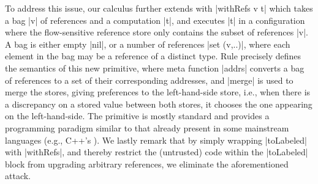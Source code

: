To address this issue, our \lioafs{} calculus further extends \liofs{} with
|withRefs v t| which takes a bag |v| of references and a computation |t|, and
executes |t| in a configuration where the flow-sensitive reference store only
contains the subset of references |v|.
%
A bag is either empty |nil|, or a number of references |set (v,..)|, where each
element in the bag may be a reference of a distinct type.
%
Rule  precisely defines the semantics of this new primitive,
where meta function |addrs| converts a bag of references to a set of their
corresponding addresses, and |merge| is used to merge the stores, giving
preferences to the left-hand-side store, i.e., when there is a discrepancy on a
stored value between both stores, it chooses the one appearing on the
left-hand-side.
%
The primitive is mostly standard and provides a programming paradigm similar to
that already present in some mainstream languages (e.g., C++'s ).
%
We lastly remark that by simply wrapping |toLabeled| with |withRefs|, and
thereby restrict the (untrusted) code within the |toLabeled| block from
upgrading arbitrary references, we eliminate the aforementioned attack.





